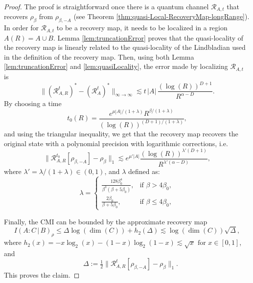 \documentclass[11pt]{article}
\numberwithin{equation}{section}
\numberwithin{figure}{section}
\numberwithin{table}{section}
\theoremstyle{definition}
\theoremstyle{plain}
\theoremstyle{remark}
\newcommand{\RR}{\mathcal{R}}
\newcommand{\abs}[1]{\left \vert#1\right\vert}
\begin{document}
\begin{proof}
    The proof is straightforward once there is a quantum channel $\RR_{A,t}$ that recovers $\rho_\beta$ from $\rho_{\beta,-A}$ (see Theorem \ref{thm:quasi-Local-RecoveryMap-longRange}). In order for $\RR_{A,t}$ to be a recovery map, it needs to be localized in a region $A(R)=A\cup B$. Lemma \ref{lem:truncationError} proves that the quasi-locality of the recovery map is linearly related to the quasi-locality of the Lindbladian used in the definition of the recovery map. Then, using both Lemma \ref{lem:truncationError} and \ref{lem:quasiLocality}, the error made by localizing $\RR_{A,t}$ is
\begin{equation}
    \bigl\| (\mathcal{R}^t_{A,R})^* -  (\mathcal{R}^t_{A})^* \bigr\|_{\infty \to \infty}
    \lesssim
    t \, \abs{A}\,\dfrac{(\log (R))^{D+1}}{R^{\alpha-D}}.
\end{equation}
By choosing a time
\begin{equation}
    t_0(R)=\dfrac{e^{\mu \abs{A}/(1+\lambda)}R^{\beta/(1+\lambda)}}{(\log (R))^{(D+1)/(1+\lambda)}},
    \label{eq:timeRecovery}
\end{equation}
and using the triangular inequality, we get that the recovery map recovers the original state with a polynomial precision with logarithmic corrections, i.e.
\begin{equation}
     \bigl\| \mathcal{R}^{t_0}_{A,R}[\rho_{\beta,-A}] - \rho_\beta \bigr\|_1 \lesssim e^{\mu '\abs{A}} \dfrac{(\log (R))^{\lambda'(D+1)}}{R^{\lambda ' (\alpha-D)}},
     \label{eq:localRecovery}
\end{equation}
where $\lambda'=\lambda/(1+\lambda)\in (0,1)$, and $\lambda$ defined as:
\begin{equation}\label{eq:lambdaValues}
    \lambda =
    \begin{cases}
        \frac{128\beta_0^4}{\beta^3(\beta + 5\beta_0)}, & \text{if } \beta > 4\beta_0,\\[0.6em]
        \frac{2\beta_0}{\beta + 5\beta_0}, & \text{if } \beta \le 4\beta_0,
    \end{cases}
\end{equation}

Finally, the CMI can be bounded by the approximate recovery map
\begin{equation}
    I(A : C \,|\, B)_\rho 
\le 
\Delta \log(\dim(C)) + h_2(\Delta)
\lesssim 
\log(\dim(C)) \sqrt{\Delta},
\end{equation}
where $h_2(x) = -x \log_2(x) - (1 - x) \log_2(1 - x)
\lesssim \sqrt{x} \text{ for } x \in [0,1]$,
and\[
\quad
\Delta := \tfrac{1}{2} \bigl\| \mathcal{R}_{A,R}^t[\rho_{\beta,-A}] - \rho_\beta \bigr\|_1 .
\]
This proves the claim.
\end{proof}
\end{document}
